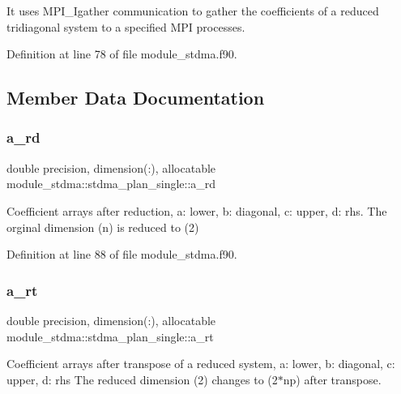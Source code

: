 It uses M\+P\+I\+\_\+\+Igather communication to gather the coefficients of a reduced tridiagonal system to a specified M\+PI processes. 

Definition at line 78 of file module\+\_\+stdma.\+f90.



\subsection{Member Data Documentation}
\mbox{\label{structmodule__stdma_1_1stdma__plan__single_a74a506a97cfe769297cc3f6fdfbc6039}} 
\subsubsection{\texorpdfstring{a\_rd}{a\_rd}}
{\footnotesize\ttfamily double precision, dimension(\+:), allocatable module\+\_\+stdma\+::stdma\+\_\+plan\+\_\+single\+::a\+\_\+rd}



Coefficient arrays after reduction, a\+: lower, b\+: diagonal, c\+: upper, d\+: rhs. The orginal dimension (n) is reduced to (2) 



Definition at line 88 of file module\+\_\+stdma.\+f90.

\mbox{\label{structmodule__stdma_1_1stdma__plan__single_aa1f44d6faeaee89e6648a91accb05b1c}} 
\subsubsection{\texorpdfstring{a\_rt}{a\_rt}}
{\footnotesize\ttfamily double precision, dimension(\+:), allocatable module\+\_\+stdma\+::stdma\+\_\+plan\+\_\+single\+::a\+\_\+rt}



Coefficient arrays after transpose of a reduced system, a\+: lower, b\+: diagonal, c\+: upper, d\+: rhs The reduced dimension (2) changes to (2$\ast$np) after transpose. 



